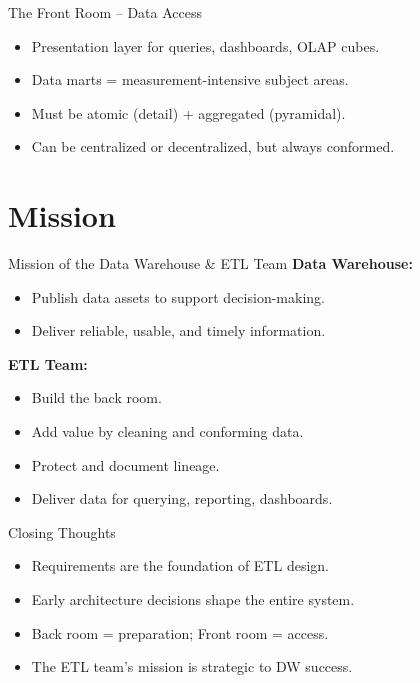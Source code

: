 \documentclass[aspectratio=169]{beamer}
\begin{document}
\begin{frame}{The Front Room – Data Access}
    \begin{itemize}
        \item Presentation layer for queries, dashboards, OLAP cubes.
        \item Data marts = measurement-intensive subject areas.
        \item Must be atomic (detail) + aggregated (pyramidal).
        \item Can be centralized or decentralized, but always conformed.
    \end{itemize}
\end{frame}

\section{Mission}
    \begin{frame}{Mission of the Data Warehouse \& ETL Team}
    \textbf{Data Warehouse:}
    \begin{itemize}
        \item Publish data assets to support decision-making.
        \item Deliver reliable, usable, and timely information.
    \end{itemize}
    \textbf{ETL Team:}
    \begin{itemize}
        \item Build the back room.
        \item Add value by cleaning and conforming data.
        \item Protect and document lineage.
        \item Deliver data for querying, reporting, dashboards.
    \end{itemize}
\end{frame}

\begin{frame}{Closing Thoughts}
    \begin{itemize}
        \item Requirements are the foundation of ETL design.
        \item Early architecture decisions shape the entire system.
        \item Back room = preparation; Front room = access.
        \item The ETL team’s mission is strategic to DW success.
    \end{itemize}
\end{frame}
\end{document}
